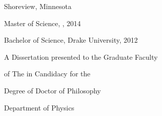 
\begin{titlepage}
\large{
    \singlespacing
    \begin{center}
        \vspace{1cm}

        {\maintitle}
        
        \vspace{0.5cm}
        
        \vspace{2.5cm}
        
        {\name}
        
        Shoreview, Minnesota
        
        \vspace{2.5cm}
        
        Master of Science, {\CWM}, 2014
        
        Bachelor of Science, Drake University, 2012
        
        \vspace{2.5cm}
        
        A Dissertation presented to the Graduate Faculty 
        
        of The {\CWM} in Candidacy for the
        
        Degree of Doctor of Philosophy
        
        \vspace{2.5cm}
        
        Department of Physics
        
        \vspace{2.5cm}
        
        {\CWM}
    
        \monthyear
    \end{center}
}
\end{titlepage}